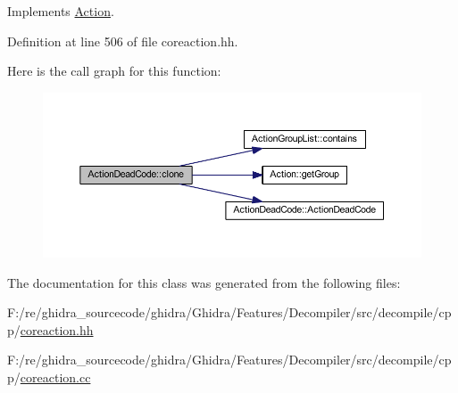 Implements \mbox{\hyperlink{class_action_af8242e41d09e5df52f97df9e65cc626f}{Action}}.



Definition at line 506 of file coreaction.\+hh.

Here is the call graph for this function\+:
\nopagebreak
\begin{figure}[H]
\begin{center}
\leavevmode
\includegraphics[width=350pt]{class_action_dead_code_a2c1a4dac2eab0a2a6979c073def75fc3_cgraph}
\end{center}
\end{figure}


The documentation for this class was generated from the following files\+:\begin{DoxyCompactItemize}
\item 
F\+:/re/ghidra\+\_\+sourcecode/ghidra/\+Ghidra/\+Features/\+Decompiler/src/decompile/cpp/\mbox{\hyperlink{coreaction_8hh}{coreaction.\+hh}}\item 
F\+:/re/ghidra\+\_\+sourcecode/ghidra/\+Ghidra/\+Features/\+Decompiler/src/decompile/cpp/\mbox{\hyperlink{coreaction_8cc}{coreaction.\+cc}}\end{DoxyCompactItemize}
